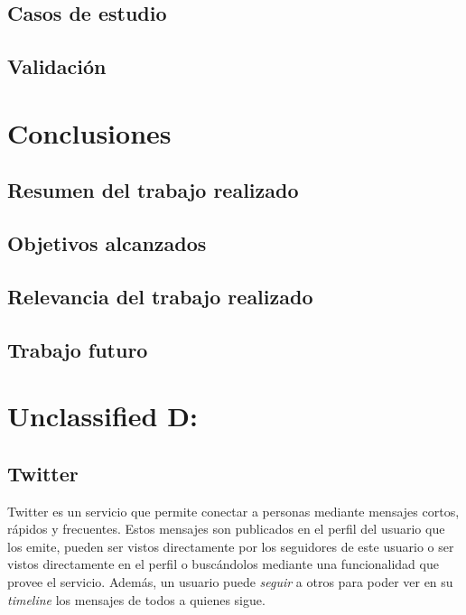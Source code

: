 \documentclass[upright, contnum]{umemoria}
\begin{document}
\section{Casos de estudio}
\label{sec-4.3}

\section{Validación}
\label{sec-4.4}

\chapter{Conclusiones}
\label{sec-5}

\section{Resumen del trabajo realizado}
\label{sec-5.1}

\section{Objetivos alcanzados}
\label{sec-5.2}

\section{Relevancia del trabajo realizado}
\label{sec-5.3}

\section{Trabajo futuro}
\label{sec-5.4}




\chapter{Unclassified D:}
\label{sec-6}

  

\section{Twitter}
\label{sec-6.1}

Twitter es un servicio que permite conectar a personas mediante
mensajes cortos, rápidos y frecuentes. Estos mensajes son publicados
en el perfil del usuario que los emite, pueden ser vistos directamente
por los seguidores de este usuario o ser vistos directamente en el
perfil o buscándolos mediante una funcionalidad que provee el
servicio. Además, un usuario puede \emph{seguir} a otros para poder ver en
su \emph{timeline} los mensajes de todos a quienes sigue.
\end{document}
